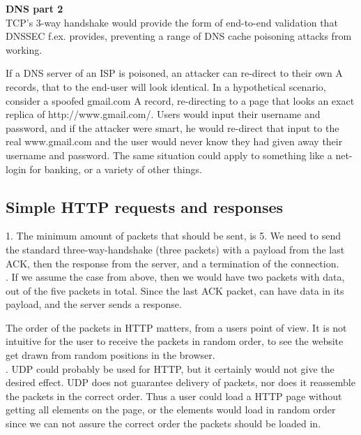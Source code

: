 \noindent \textbf{DNS part 2} \\
TCP's 3-way handshake would provide the form of end-to-end validation that DNSSEC f.ex. provides, preventing
a range of DNS cache poisoning attacks from working. 

If a DNS server of an ISP is poisoned, an attacker can re-direct to their own A records, that to the end-user will
look identical. In a hypothetical scenario, consider a spoofed gmail.com A record, re-directing to a page that looks
an exact replica of http://www.gmail.com/. Users would input their username and password, and if the attacker were smart,
he would re-direct that input to the real www.gmail.com and the user would never know they had given away their username
and password. The same situation could apply to something like a net-login for banking, or a variety of other things.

\subsection*{Simple HTTP requests and responses}
1. The minimum amount of packets that should be sent, is 5. We need to send the
standard three-way-handshake (three packets) with a payload from the last ACK,
then the response from the server, and a termination of the connection. \\

. If we assume the case from above, then we would have two packets
with data, out of the five packets in total. Since the last ACK packet, can have
data in its payload, and the server sends a response.

The order of the packets in HTTP matters, from a users point of view. It is not
intuitive for the user to receive the packets in random order, to see the website
get drawn from random positions in the browser. \\

. UDP could probably be used for HTTP, but it certainly would not
give the desired effect. UDP does not guarantee delivery of packets, nor does it
reassemble the packets in the correct order. Thus a user could load a HTTP page
without getting all elements on the page, or the elements would load in random
order since we can not assure the correct order the packets should be loaded in.